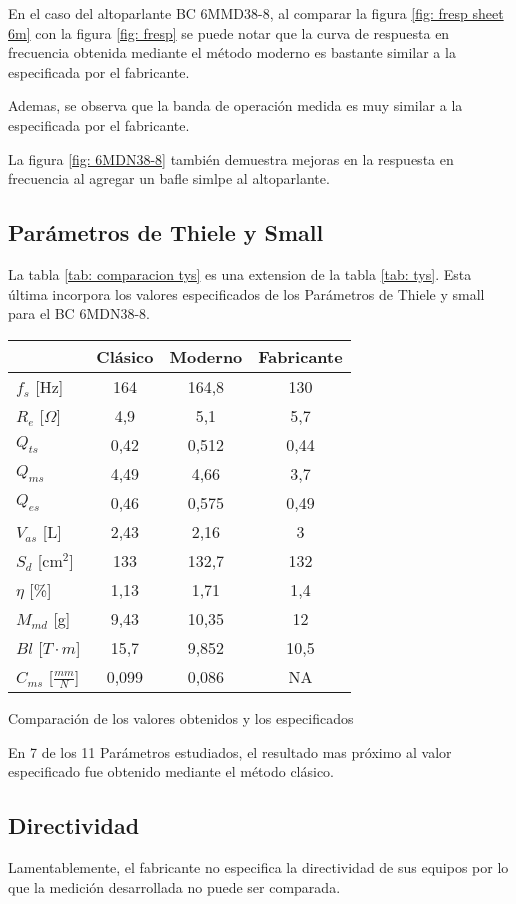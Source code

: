 \documentclass[]{article}
\makeatletter
\newcommand{\tabla}[4]{
\vspace{0.3 cm}
\begin{tablehere}
\begin{center}
\begin{tabular}{#1}
#2
\end{tabular}
\caption{#3}
\label{#4}
\end{center}
\end{tablehere}
\vspace{0.3 cm}
}
\newenvironment{tablehere}    %
  {\def\@captype{table}}    %

  {}              %
\makeatother
\begin{document}
\begin{multicols}{2}
En el caso del altoparlante BC 6MMD38-8, al comparar la figura
\ref{fig: fresp sheet 6m} con la figura \ref{fig: fresp}
se puede notar que la curva de respuesta en frecuencia obtenida mediante el método moderno
es bastante similar a la especificada por el fabricante.

Ademas, se observa que la banda de operación medida es muy similar a la especificada
por el fabricante.

La figura \ref{fig: 6MDN38-8} también demuestra mejoras en la respuesta en frecuencia
al agregar un bafle simlpe al altoparlante.


\subsection{Parámetros de Thiele y Small}
La tabla \ref{tab: comparacion tys} es una extension de la tabla \ref{tab: tys}.
Esta última incorpora los valores especificados de los Parámetros de Thiele y small
para el BC 6MDN38-8.

\tabla
{|l|c|c|c|}
{
\hline
 & Clásico & Moderno & Fabricante\\
\hline
$f_s$ [Hz] & 164 & 164,8 & 130 \\
\hline
$R_e$ [$\Omega$] & 4,9 & 5,1 & 5,7  \\
\hline
$Q_{ts}$  & 0,42 & 0,512 & 0,44 \\
\hline
$Q_{ms}$  & 4,49 & 4,66 & 3,7 \\
\hline
$Q_{es}$    & 0,46 & 0,575 & 0,49 \\
\hline
$V_{as}$ [L] & 2,43 & 2,16 & 3 \\
\hline
$S_d$ [cm$^2$] & 133 & 132,7 & 132 \\
\hline
$\eta$ [\%{}] & 1,13 & 1,71 & 1,4 \\
\hline
$M_{md}$ [g] & 9,43 & 10,35 & 12\\
\hline
$Bl$ [$T \cdot m$] & 15,7 & 9,852 & 10,5\\
\hline
$C_{ms}$ [$\frac{mm}{N}$] & 0,099 & 0,086 & NA \\
\hline
}
{Comparación de los valores obtenidos y los especificados}
{tab: comparacion tys}

En 7 de los 11 Parámetros estudiados, el resultado mas próximo al valor especificado
fue obtenido mediante el método clásico.

\subsection{Directividad}
Lamentablemente, el fabricante no especifica la directividad de sus equipos
por lo que la medición desarrollada no puede ser comparada.




\printbibliography

\end{multicols}
\end{document}
